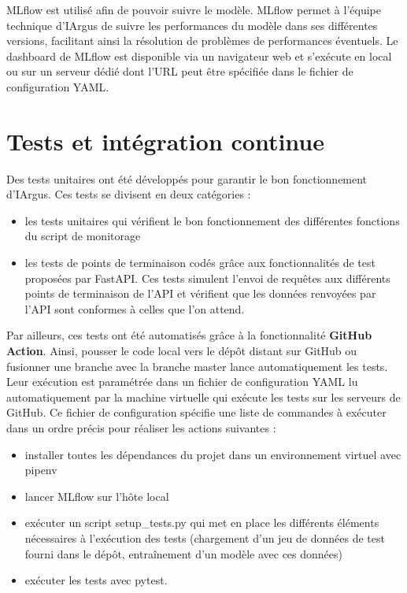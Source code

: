\documentclass[french]{article}
\begin{document}
    MLflow est utilisé afin de pouvoir suivre le modèle. MLflow permet à l'équipe technique d'IArgus de suivre les performances du modèle dans ses différentes versions, facilitant ainsi la résolution de problèmes de performances éventuels. Le dashboard de MLflow est disponible via un navigateur web et s'exécute en local ou sur un serveur dédié dont l'URL peut être spécifiée dans le fichier de configuration YAML.

    \section{Tests et intégration continue}

    Des tests unitaires ont été développés pour garantir le bon fonctionnement d'IArgus. Ces tests se divisent en deux catégories :
    \begin{itemize}
        \item les tests unitaires qui vérifient le bon fonctionnement des différentes fonctions du script de monitorage
        \item les tests de points de terminaison codés grâce aux fonctionnalités de test proposées par FastAPI. Ces tests simulent l'envoi de requêtes aux différents points de terminaison de l'API et vérifient que les données renvoyées par l'API sont conformes à celles que l'on attend.
    \end{itemize}

    Par ailleurs, ces tests ont été automatisés grâce à la fonctionnalité \textbf{GitHub Action}. Ainsi, pousser le code local vers le dépôt distant sur GitHub ou fusionner une branche avec la branche master lance automatiquement les tests. Leur exécution est paramétrée dans un fichier de configuration YAML lu automatiquement par la machine virtuelle qui exécute les tests sur les serveurs de GitHub. Ce fichier de configuration spécifie une liste de commandes à exécuter dans un ordre précis pour réaliser les actions suivantes :
    \begin{itemize}
        \item installer toutes les dépendances du projet dans un environnement virtuel avec pipenv
        \item lancer MLflow sur l'hôte local
        \item exécuter un script setup\_tests.py qui met en place les différents éléments nécessaires à l'exécution des tests (chargement d'un jeu de données de test fourni dans le dépôt, entraînement d'un modèle avec ces données)
        \item exécuter les tests avec pytest.
    \end{itemize}
\end{document}
